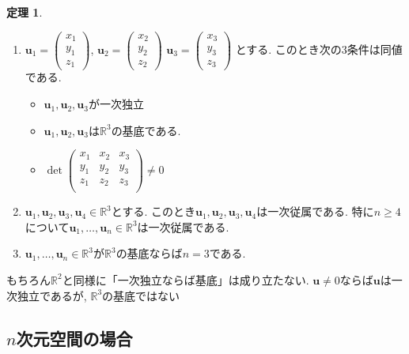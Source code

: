 \documentclass[dvipdfmx,a4paper,11pt]{article}
\newcommand{\R}{\mathbb{R}}
\theoremstyle{definition}
\newtheorem{thm}{定理}
\begin{document}
\begin{tcolorbox}[
    colback = white,
    colframe = green!35!black,
    fonttitle = \bfseries,
    breakable = true]
    \begin{thm}
    \begin{enumerate}
	\setlength{\parskip}{0cm}
  	\setlength{\itemsep}{0pt} 
\item $\bm{u}_1 =   
\begin{pmatrix}
x_1\\  y_1\\ z_1
 \end{pmatrix} $, 
 $\bm{u}_2 =   
\begin{pmatrix}
x_2\\  y_2\\ z_2
 \end{pmatrix} $
  $\bm{u}_3 =   
\begin{pmatrix}
x_3\\  y_3\\ z_3
 \end{pmatrix} $
 とする. このとき次の3条件は同値である.
 \begin{itemize}
 \setlength{\parskip}{0cm}
  	\setlength{\itemsep}{0pt} 
 \item $\bm{u}_1, \bm{u}_2,  \bm{u}_3$が一次独立
  \item $\bm{u}_1, \bm{u}_2,  \bm{u}_3$は$\R^3$の基底である. 
\item  $\det 
 \begin{pmatrix}
x_1&x_2&x_3\\  
y_1&y_2&y_3\\ 
z_1&z_2&z_3\\
 \end{pmatrix} 
  \neq 0$
  \end{itemize}
 \item  $\bm{u}_1, \bm{u}_2, \bm{u}_3,  \bm{u}_4\in \R^3 $とする. このとき$\bm{u}_1, \bm{u}_2, \bm{u}_3, \bm{u}_4$は一次従属である. 特に$n \ge 4$について$\bm{u}_1, \ldots, \bm{u}_n \in \R^3$は一次従属である. 
 \item   $\bm{u}_1, \ldots, \bm{u}_n \in \R^3 $が$\R^3$の基底ならば$n=3$である. 
\end{enumerate}
    \end{thm}
 \end{tcolorbox}


もちろん$\R^2$と同様に「一次独立ならば基底」は成り立たない. 
$\bm{u}\neq 0$ならば$\bm{u}$は一次独立であるが, $\R^3$の基底ではない
 
 \subsection{$n$次元空間の場合}
 
\end{document}
